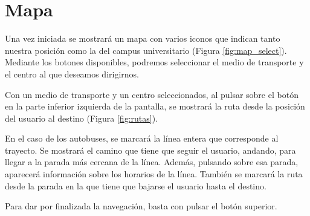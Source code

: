\documentclass[a4paper,12pt]{report}
\begin{document}
\section{Mapa}
  Una vez iniciada se mostrará un mapa con varios iconos que indican tanto nuestra posición como la del campus universitario (Figura \ref{fig:map_select}). Mediante los botones disponibles, podremos seleccionar el medio de transporte y el centro al que deseamos dirigirnos.

  Con un medio de transporte y un centro seleccionados, al pulsar sobre el botón en la parte inferior izquierda de la pantalla, se mostrará la ruta desde la posición del usuario al destino (Figura \ref{fig:rutas}).
  
  En el caso de los autobuses, se marcará la línea entera que corresponde al trayecto. Se mostrará el camino que tiene que seguir el usuario, andando, para llegar a la parada más cercana de la línea. Además, pulsando sobre esa parada, aparecerá información sobre los horarios de la línea. También se marcará la ruta desde la parada en la que tiene que bajarse el usuario hasta el destino.

  Para dar por finalizada la navegación, basta con pulsar el botón superior.
\end{document}
